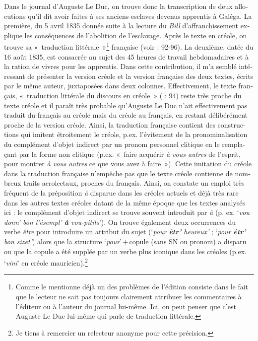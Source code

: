 \documentclass[output=paper]{langscibook}
\begin{document}
\begin{otherlanguage}{french}
Dans le journal d’Auguste Le Duc, on trouve donc la transcription de deux allocutions qu’il dit avoir faites à ses anciens esclaves devenus apprentis à Galéga. La première, du 5 avril 1835 donnée suite à la lecture du \textit{Bill} d’affranchissement explique les conséquences de l’abolition de l’esclavage. Après le texte en créole, on trouve sa «~traduction littérale~»\footnote{Comme le mentionne déjà \citet{Chaudenson1995} un des problèmes de l’édition consiste dans le fait que le lecteur ne sait pas toujours clairement attribuer les commentaires à l’éditeur ou à l’auteur du journal lui-même. Ici, on peut penser que c’est Auguste Le Duc lui-même qui parle de traduction littérale.} française (voir \citealt{Pourcelet1994} : 92-96). La deuxième, datée du 16 août 1835, est consacrée au sujet des 45 heures de travail hebdomadaires et à la ration de vivres pour les apprentis. Dans cette contribution, il m’a semblé intéressant de présenter la version créole et la version française des deux textes, écrits par le même auteur, juxtaposées dans deux colonnes. Effectivement, le texte français, «~traduction littérale du discours en créole~» (\citealt{Pourcelet1994} : 94) reste très proche du texte créole et il paraît très probable qu’Auguste Le Duc n’ait effectivement pas traduit du français au créole mais du créole au français, en restant délibérément proche de la version créole. Ainsi, la traduction française contient des constructions qui imitent étroitement le créole, p.ex. l’évitement de la pronominalisation du complément d’objet indirect par un pronom personnel clitique en le remplaçant par la forme non clitique (p.ex. «~faire acquérir \textit{à vous autres} de l’esprit, pour montrer \textit{à vous autres} ce que vous avez à faire~»). Cette imitation du créole dans la traduction française n’empêche pas que le texte créole contienne de nombreux traits acrolectaux, proches du français. Ainsi, on constate un emploi très fréquent de la préposition \textit{à} disparue dans les créoles actuels et déjà très rare dans les autres textes créoles datant de la même époque que les textes analysés ici : le complément d’objet indirect se trouve souvent introduit par \textit{à} (p. ex. ‘\textit{vou donn’ bon l’ésempl’ \textbf{à} vou-pitits}’). On trouve également deux occurrences du verbe \textit{être} pour introduire un attribut du sujet (‘\textit{pour \textbf{êtr’} heureux’} ; ‘\textit{pour \textbf{êtr’} bon sizet’}) alors que la structure ‘\textit{pour}’\,+\,copule (sans SN ou pronom) a disparu ou que la copule a été supplée par un verbe plus iconique dans les créoles (p.ex. ‘\textit{vini}’ en créole mauricien).\footnote{Je tiens à remercier un relecteur anonyme pour cette précision.} 


\end{otherlanguage}
\end{document}
